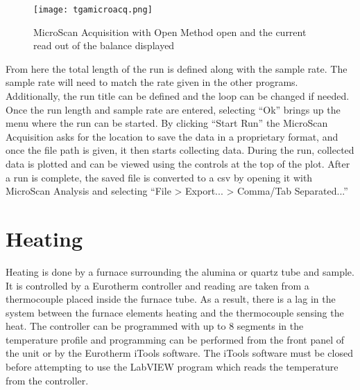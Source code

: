         \begin{figure}
            \begin{center}
            \texttt{[image: tgamicroacq.png]}
            \end{center}
            \caption{MicroScan Acquisition with Open Method open and the current read out of the balance displayed}
            \label{fig:tgamicroaq}
        \end{figure}

        From here the total length of the run is defined along with the sample rate.
        The sample rate will need to match the rate given in the other programs.
        Additionally, the run title can be defined and the loop can be changed if needed.
        Once the run length and sample rate are entered, selecting ``Ok'' brings up the menu where the run can be started.
        By clicking ``Start Run'' the MicroScan Acquisition asks for the location to save the data in a proprietary format, and once the file path is given, it then starts collecting data.
        During the run, collected data is plotted and can be viewed using the controls at the top of the plot.
        After a run is complete, the saved file is converted to a csv by opening it with MicroScan Analysis and selecting ``File \textgreater{} Export... \textgreater{} Comma/Tab Separated...''

\section{Heating}
    Heating is done by a furnace surrounding the alumina or quartz tube and sample.
    It is controlled by a Eurotherm controller and reading are taken from a thermocouple placed inside the furnace tube.
    As a result, there is a lag in the system between the furnace elements heating and the thermocouple sensing the heat.
    The controller can be programmed with up to 8 segments in the temperature profile and programming can be performed from the front panel of the unit or by the Eurotherm iTools software.
    The iTools software must be closed before attempting to use the LabVIEW program which reads the temperature from the controller.


